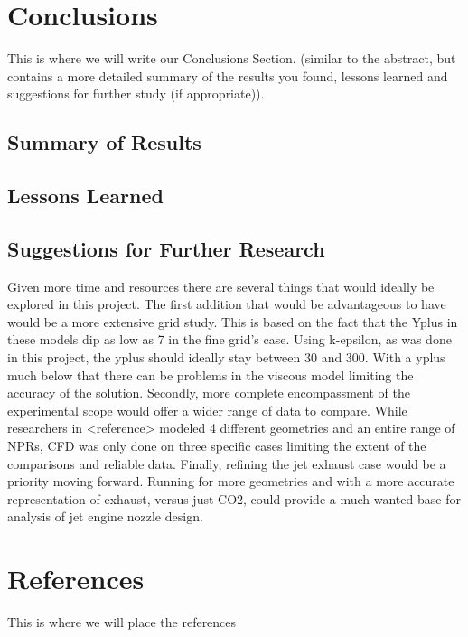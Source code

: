 \documentclass[12pt]{article} %
\begin{document}
\section{Conclusions}
This is where we will write our Conclusions Section.  (similar to the abstract, but contains a more detailed summary
of the results you found, lessons learned and suggestions for further study (if
appropriate)).
\subsection{Summary of Results}
\subsection{Lessons Learned}

\subsection{Suggestions for Further Research}
Given more time and resources there are several things that would ideally be explored in this project. The first addition that would be advantageous to have would be a more extensive grid study. This is based on the fact that the Yplus in these models dip as low as 7 in the fine grid’s case. Using k-epsilon, as was done in this project, the yplus should ideally stay between 30 and 300. With a yplus much below that there can be problems in the viscous model limiting the accuracy of the solution. Secondly, more complete encompassment of the experimental scope would offer a wider range of data to compare. While researchers in <reference> modeled 4 different geometries and an entire range of NPRs, CFD was only done on three specific cases limiting the extent of the comparisons and reliable data. Finally, refining the jet exhaust case would be a priority moving forward. Running for more geometries and with a more accurate representation of exhaust, versus just CO2, could provide a much-wanted base for analysis of jet engine nozzle design.





\section{References}
This is where we will place the references
\nocite{*}
\begingroup
\renewcommand{\section}[2]{}%


\endgroup
\end{document}
